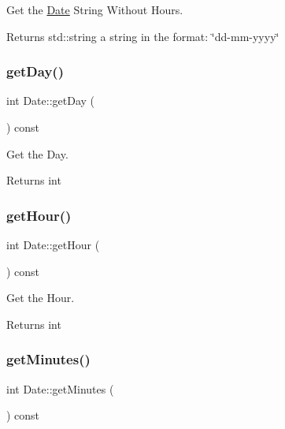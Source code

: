 Get the \mbox{\hyperlink{classDate}{Date}} String Without Hours. 

\begin{DoxyReturn}{Returns}
std\+::string a string in the format\+: \char`\"{}dd-\/mm-\/yyyy\char`\"{} 
\end{DoxyReturn}
\mbox{\label{classDate_a0f253815240e70f4c39cb93cc68bd3f4}} 
\subsubsection{\texorpdfstring{get\+Day()}{getDay()}}
{\footnotesize\ttfamily int Date\+::get\+Day (\begin{DoxyParamCaption}{ }\end{DoxyParamCaption}) const}



Get the Day. 

\begin{DoxyReturn}{Returns}
int 
\end{DoxyReturn}
\mbox{\label{classDate_ab8ea9e1aafa6cb95be7b82cda0c53cfe}} 
\subsubsection{\texorpdfstring{get\+Hour()}{getHour()}}
{\footnotesize\ttfamily int Date\+::get\+Hour (\begin{DoxyParamCaption}{ }\end{DoxyParamCaption}) const}



Get the Hour. 

\begin{DoxyReturn}{Returns}
int 
\end{DoxyReturn}
\mbox{\label{classDate_a55251df891f43b9f19419cd79ce69876}} 
\subsubsection{\texorpdfstring{get\+Minutes()}{getMinutes()}}
{\footnotesize\ttfamily int Date\+::get\+Minutes (\begin{DoxyParamCaption}{ }\end{DoxyParamCaption}) const}



